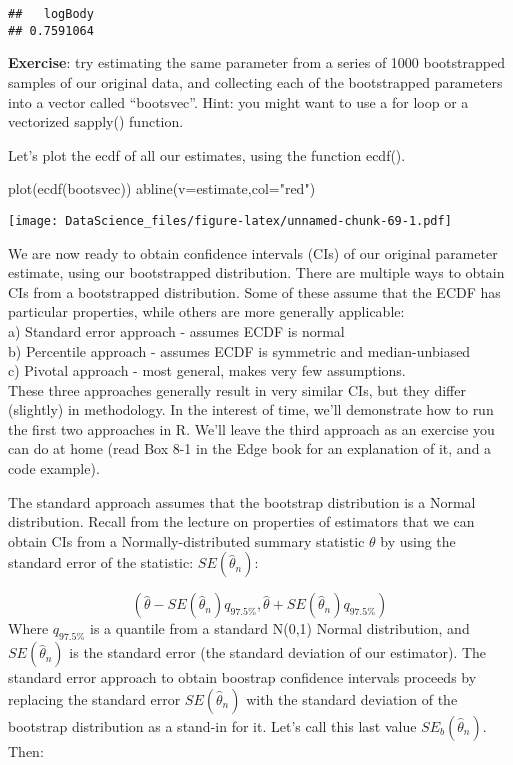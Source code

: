 \documentclass[
]{book}
\newenvironment{Shaded}{\begin{snugshade}}{\end{snugshade}}
\newcommand{\AttributeTok}[1]{\textcolor[rgb]{0.77,0.63,0.00}{#1}}
\newcommand{\FunctionTok}[1]{\textcolor[rgb]{0.00,0.00,0.00}{#1}}
\newcommand{\NormalTok}[1]{#1}
\newcommand{\StringTok}[1]{\textcolor[rgb]{0.31,0.60,0.02}{#1}}
\begin{document}
\begin{verbatim}
##   logBody 
## 0.7591064
\end{verbatim}

\textbf{Exercise}: try estimating the same parameter from a series of 1000 bootstrapped samples of our original data, and collecting each of the bootstrapped parameters into a vector called ``bootsvec''. Hint: you might want to use a for loop or a vectorized sapply() function.

Let's plot the ecdf of all our estimates, using the function ecdf().

\begin{Shaded}
\begin{Highlighting}[]
\FunctionTok{plot}\NormalTok{(}\FunctionTok{ecdf}\NormalTok{(bootsvec))}
\FunctionTok{abline}\NormalTok{(}\AttributeTok{v=}\NormalTok{estimate,}\AttributeTok{col=}\StringTok{"red"}\NormalTok{)}
\end{Highlighting}
\end{Shaded}

\texttt{[image: DataScience\_files/figure-latex/unnamed-chunk-69-1.pdf]}

We are now ready to obtain confidence intervals (CIs) of our original parameter estimate, using our bootstrapped distribution. There are multiple ways to obtain CIs from a bootstrapped distribution. Some of these assume that the ECDF has particular properties, while others are more generally applicable:\\
a) Standard error approach - assumes ECDF is normal\\
b) Percentile approach - assumes ECDF is symmetric and median-unbiased\\
c) Pivotal approach - most general, makes very few assumptions.\\
These three approaches generally result in very similar CIs, but they differ (slightly) in methodology. In the interest of time, we'll demonstrate how to run the first two approaches in R. We'll leave the third approach as an exercise you can do at home (read Box 8-1 in the Edge book for an explanation of it, and a code example).

The standard approach assumes that the bootstrap distribution is a Normal distribution. Recall from the lecture on properties of estimators that we can obtain CIs from a Normally-distributed summary statistic \(\theta\) by using the standard error of the statistic: \(SE(\hat{\theta}_n)\):

\[(\hat{\theta} - SE(\hat{\theta}_n)q_{97.5\%}, \hat{\theta} + SE(\hat{\theta}_n)q_{97.5\%})\]
Where \(q_{97.5\%}\) is a quantile from a standard N(0,1) Normal distribution, and \(SE(\hat{\theta}_n)\) is the standard error (the standard deviation of our estimator). The standard error approach to obtain boostrap confidence intervals proceeds by replacing the standard error \(SE(\hat{\theta}_n)\) with the standard deviation of the bootstrap distribution as a stand-in for it. Let's call this last value \(SE_b(\hat{\theta}_n)\). Then:
\end{document}
